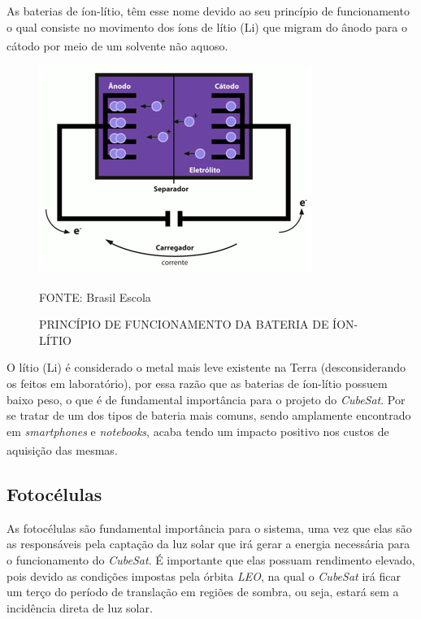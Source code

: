 \documentclass[
	12pt,				%
	openright,			%
	oneside,			%
	a4paper,			%
	english,			%
	french,				%
	spanish,			%
	brazil,				%
	oldfontcommands
	]{abntex2}
\begin{document}
	As baterias de íon-lítio, têm esse nome devido ao seu princípio de funcionamento o qual consiste no movimento dos íons de lítio (Li) que migram do ânodo para o cátodo por meio de um solvente não aquoso.\textsuperscript{\cite{BraEsc}}
	
	\begin{figure}[th]
		\caption{PRINCÍPIO DE FUNCIONAMENTO DA BATERIA DE ÍON-LÍTIO}
		\centering
		\includegraphics[width=0.6\linewidth]{./figs/cubesat_05}
			
		\begin{small}
			FONTE: Brasil Escola\textsuperscript{\cite{BraEsc}}
		\end{small}		
	\end{figure}
	
	O lítio (Li) é considerado o metal mais leve existente na Terra (desconsiderando os feitos em laboratório), por essa razão que as baterias de íon-lítio possuem baixo peso, o que é de fundamental importância para o projeto do \textit{CubeSat}. Por se tratar de um dos tipos de bateria mais comuns, sendo amplamente encontrado em \textit{smartphones} e \textit{notebooks}, acaba tendo um impacto positivo nos custos de aquisição das mesmas.\textsuperscript{\cite{TecMundo}}
	
\subsection[Fotocélulas]{Fotocélulas}

	As fotocélulas são fundamental importância para o sistema, uma vez que elas são as responsáveis pela captação da luz solar que irá gerar a energia necessária para o funcionamento do \textit{CubeSat}. É importante que elas possuam rendimento elevado, pois devido as condições impostas pela órbita \textit{LEO}, na qual o \textit{CubeSat} irá ficar um terço do período de translação em regiões de sombra, ou seja, estará sem a incidência direta de luz solar.
	
\end{document}
